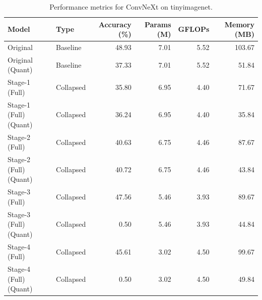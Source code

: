 \begin{table}
\caption{Performance metrics for ConvNeXt on tinyimagenet.}
\label{tab:ConvNeXt_tinyimagenet}
\begin{tabular}{llrrrr}
\toprule
Model & Type & Accuracy (\%) & Params (M) & GFLOPs & Memory (MB) \\
\midrule
Original & Baseline & 48.93 & 7.01 & 5.52 & 103.67 \\
Original
(Quant) & Baseline & 37.33 & 7.01 & 5.52 & 51.84 \\
Stage-1 (Full) & Collapsed & 35.80 & 6.95 & 4.40 & 71.67 \\
Stage-1 (Full)
(Quant) & Collapsed & 36.24 & 6.95 & 4.40 & 35.84 \\
Stage-2 (Full) & Collapsed & 40.63 & 6.75 & 4.46 & 87.67 \\
Stage-2 (Full)
(Quant) & Collapsed & 40.72 & 6.75 & 4.46 & 43.84 \\
Stage-3 (Full) & Collapsed & 47.56 & 5.46 & 3.93 & 89.67 \\
Stage-3 (Full)
(Quant) & Collapsed & 0.50 & 5.46 & 3.93 & 44.84 \\
Stage-4 (Full) & Collapsed & 45.61 & 3.02 & 4.50 & 99.67 \\
Stage-4 (Full)
(Quant) & Collapsed & 0.50 & 3.02 & 4.50 & 49.84 \\
\bottomrule
\end{tabular}
\end{table}
